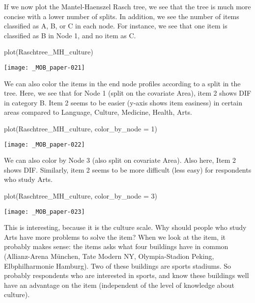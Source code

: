 \documentclass[doc,floatsintext,natbib]{apa7}
\begin{document}

If we now plot the Mantel-Haenszel Rasch tree, we see that the tree is much more concise with a lower number of splits. In addition, we see the number of items classified as A, B, or C in each node. For instance, we see that one item is classified as B in Node 1, and no item as C.

\begin{Schunk}
\begin{Sinput}
 plot(Raschtree_MH_culture)
\end{Sinput}
\end{Schunk}
\texttt{[image: \_MOB\_paper-021]}

We can also color the items in the end node profiles according to a split in the tree. Here, we see that for Node 1 (split on the covariate Area), item 2 shows DIF in category B. Item 2 seems to be easier (y-axis shows item easiness) in certain areas compared to Language, Culture, Medicine, Health, Arts. 

\begin{Schunk}
\begin{Sinput}
 plot(Raschtree_MH_culture, color_by_node = 1)
\end{Sinput}
\end{Schunk}
\texttt{[image: \_MOB\_paper-022]}

We can also color by Node 3 (also split on covariate Area). Also here, Item 2 shows DIF. Similarly, item 2 seems to be more difficult (less easy) for respondents who study Arts. 

\begin{Schunk}
\begin{Sinput}
 plot(Raschtree_MH_culture, color_by_node = 3)
\end{Sinput}
\end{Schunk}
\texttt{[image: \_MOB\_paper-023]}

This is interesting, because it is the culture scale. Why should people who study Arts have more problems to solve the item? When we look at the item, it probably makes sense: the items asks what four buildings have in common (Allianz-Arena München, Tate Modern NY, Olympia-Stadion Peking, Elbphilharmonie Hamburg). Two of these buildings are sports stadiums. So probably respondents who are interested in sports, and know these buildings well have an advantage on the item (independent of the level of knowledge about culture). 
\end{document}
